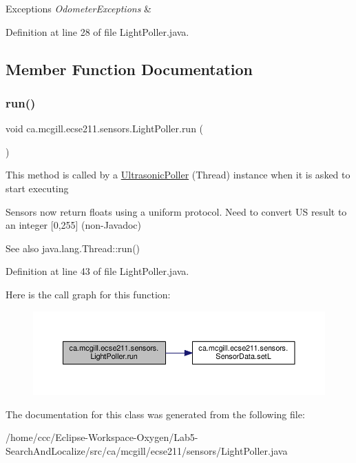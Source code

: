 \begin{DoxyExceptions}{Exceptions}
{\em Odometer\+Exceptions} & \\
\hline
\end{DoxyExceptions}


Definition at line 28 of file Light\+Poller.\+java.



\subsection{Member Function Documentation}
\mbox{\label{classca_1_1mcgill_1_1ecse211_1_1sensors_1_1_light_poller_a31751b40132d9402de493aa9ec11d9d5}} 
\subsubsection{\texorpdfstring{run()}{run()}}
{\footnotesize\ttfamily void ca.\+mcgill.\+ecse211.\+sensors.\+Light\+Poller.\+run (\begin{DoxyParamCaption}{ }\end{DoxyParamCaption})}

This method is called by a \hyperlink{classca_1_1mcgill_1_1ecse211_1_1sensors_1_1_ultrasonic_poller}{Ultrasonic\+Poller} (Thread) instance when it is asked to start executing

Sensors now return floats using a uniform protocol. Need to convert US result to an integer \mbox{[}0,255\mbox{]} (non-\/\+Javadoc)

\begin{DoxySeeAlso}{See also}
java.\+lang.\+Thread\+::run() 
\end{DoxySeeAlso}


Definition at line 43 of file Light\+Poller.\+java.

Here is the call graph for this function\+:
\nopagebreak
\begin{figure}[H]
\begin{center}
\leavevmode
\includegraphics[width=350pt]{classca_1_1mcgill_1_1ecse211_1_1sensors_1_1_light_poller_a31751b40132d9402de493aa9ec11d9d5_cgraph}
\end{center}
\end{figure}


The documentation for this class was generated from the following file\+:\begin{DoxyCompactItemize}
\item 
/home/ccc/\+Eclipse-\/\+Workspace-\/\+Oxygen/\+Lab5-\/\+Search\+And\+Localize/src/ca/mcgill/ecse211/sensors/Light\+Poller.\+java\end{DoxyCompactItemize}
